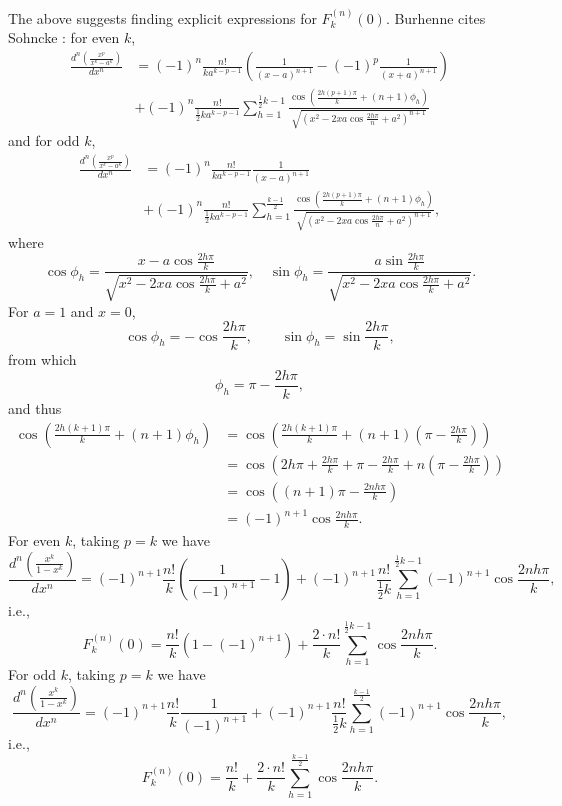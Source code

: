 \documentclass{article}
\begin{document}
The above suggests finding explicit expressions for $F_k^{(n)}(0)$. 
Burhenne cites Sohncke \cite[pp.~32--33]{sohncke}: for even $k$,
\begin{align*}
\frac{d^n\left(\frac{x^p}{x^k-a^k}\right)}{dx^n}&=(-1)^n \frac{n!}{ka^{k-p-1}}
\left(\frac{1}{(x-a)^{n+1}} - (-1)^p \frac{1}{(x+a)^{n+1}}\right)\\
&+(-1)^n \frac{n!}{\frac{1}{2}ka^{k-p-1}} \sum_{h=1}^{\frac{1}{2}k-1}
\frac{\cos\left(\frac{2h(p+1)\pi}{k}+(n+1)\phi_h\right)}{\sqrt{\left(x^2-2xa\cos \frac{2h\pi}{n}+a^2\right)^{n+1}}}
\end{align*}
and for odd $k$,
\begin{align*}
\frac{d^n\left(\frac{x^p}{x^k-a^k}\right)}{dx^n}&=(-1)^n \frac{n!}{ka^{k-p-1}} \frac{1}{(x-a)^{n+1}}\\
&+(-1)^n \frac{n!}{\frac{1}{2}ka^{k-p-1}} \sum_{h=1}^{\frac{k-1}{2}} \frac{\cos\left( \frac{2h(p+1)\pi}{k}+(n+1)\phi_h \right)}{\sqrt{\left( x^2-2xa\cos \frac{2h\pi}{n}+a^2 \right)^{n+1}}},
\end{align*}
where
\[
\cos \phi_h = \frac{x-a\cos\frac{2h\pi}{k}}{\sqrt{x^2-2xa\cos \frac{2h\pi}{k}+a^2}},
\quad \sin\phi_h = \frac{a\sin \frac{2h\pi}{k}}{\sqrt{x^2-2xa\cos \frac{2h\pi}{k}+a^2}}.
\]
For $a=1$ and $x=0$,
\[
\cos \phi_h = -\cos \frac{2h\pi}{k}, \qquad
\sin \phi_h = \sin \frac{2h \pi}{k},
\]
from which
\[
\phi_h = \pi-\frac{2h\pi}{k},
\]
and thus
\begin{align*}
\cos\left( \frac{2h(k+1)\pi}{k}+(n+1)\phi_h \right)&=
\cos\left( \frac{2h(k+1)\pi}{k}+(n+1)\left( \pi-\frac{2h\pi}{k}\right) \right)\\
&=\cos\left( 2h\pi+\frac{2h\pi}{k}+\pi-\frac{2h\pi}{k}+n\left( \pi-\frac{2h\pi}{k}\right)\right)\\
&=\cos \left( (n+1)\pi- \frac{2nh\pi}{k}\right)\\
&=(-1)^{n+1} \cos \frac{2nh\pi}{k}.
\end{align*}
For even $k$, taking $p=k$ we have
\[
\frac{d^n\left(\frac{x^k}{1-x^k}\right)}{dx^n}=(-1)^{n+1} \frac{n!}{k}\left( \frac{1}{(-1)^{n+1}}-1\right)
+(-1)^{n+1} \frac{n!}{\frac{1}{2}k} \sum_{h=1}^{\frac{1}{2}k-1} (-1)^{n+1} \cos \frac{2nh\pi}{k},
\]
i.e.,
\[
F_k^{(n)}(0) = \frac{n!}{k}(1-(-1)^{n+1})
+\frac{2\cdot n!}{k} \sum_{h=1}^{\frac{1}{2}k-1} \cos \frac{2nh\pi}{k}.
\]
For odd $k$, taking $p=k$ we have
\[
\frac{d^n\left(\frac{x^k}{1-x^k}\right)}{dx^n}=(-1)^{n+1} \frac{n!}{k} \frac{1}{(-1)^{n+1}}
+(-1)^{n+1} \frac{n!}{\frac{1}{2}k} \sum_{h=1}^{\frac{k-1}{2}} (-1)^{n+1} \cos \frac{2nh\pi}{k},
\]
i.e.,
\[
F_k^{(n)}(0) = \frac{n!}{k}+\frac{2\cdot n!}{k} \sum_{h=1}^{\frac{k-1}{2}} \cos \frac{2nh\pi}{k}.
\]
\end{document}
